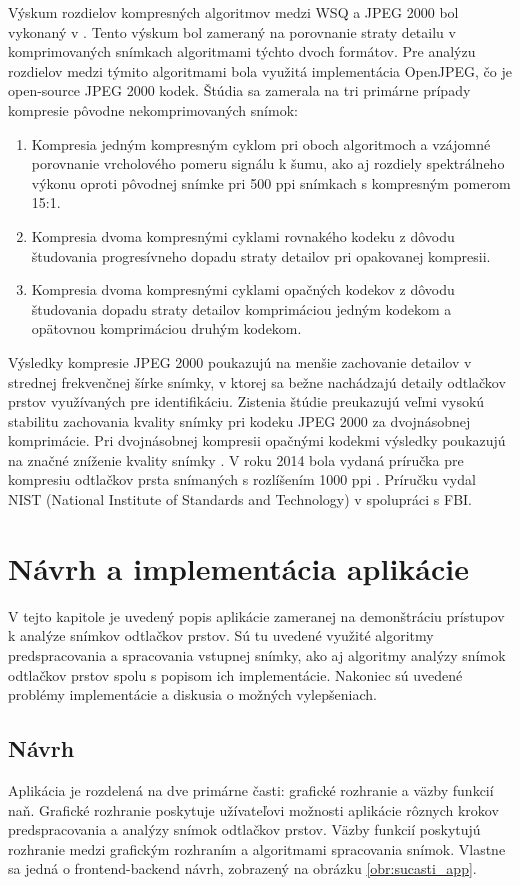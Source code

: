   Výskum rozdielov kompresných algoritmov medzi WSQ a JPEG 2000 bol vykonaný v \cite{Libert}. Tento výskum bol zameraný na porovnanie straty detailu
  v komprimovaných snímkach algoritmami týchto dvoch formátov. Pre analýzu rozdielov medzi týmito algoritmami bola využitá implementácia OpenJPEG,
  čo je open-source JPEG 2000 kodek. Štúdia sa zamerala na tri primárne prípady kompresie pôvodne nekomprimovaných snímok:
  \begin{enumerate}
    \item Kompresia jedným kompresným cyklom pri oboch algoritmoch a vzájomné porovnanie vrcholového pomeru signálu k šumu, ako aj rozdiely spektrálneho
          výkonu oproti pôvodnej snímke pri 500 ppi snímkach s kompresným pomerom 15:1.
    \item Kompresia dvoma kompresnými cyklami rovnakého kodeku z dôvodu študovania progresívneho dopadu straty detailov pri opakovanej kompresii.
    \item Kompresia dvoma kompresnými cyklami opačných kodekov z dôvodu študovania dopadu straty detailov komprimáciou jedným kodekom a opätovnou komprimáciou
          druhým kodekom.
  \end{enumerate}
  Výsledky kompresie JPEG 2000 poukazujú na menšie zachovanie detailov v strednej frekvenčnej šírke snímky, v ktorej sa bežne nachádzajú detaily odtlačkov
  prstov využívaných pre identifikáciu. Zistenia štúdie preukazujú veľmi vysokú stabilitu zachovania kvality snímky pri kodeku JPEG 2000 za dvojnásobnej
  komprimácie. Pri dvojnásobnej kompresii opačnými kodekmi výsledky poukazujú na značné zníženie kvality snímky \cite{Libert}. V roku 2014 bola vydaná
  príručka pre kompresiu odtlačkov prsta snímaných s rozlíšením 1000 ppi \cite{orandi2014guidance}. Príručku vydal NIST (National Institute of Standards
  and Technology) v spolupráci s FBI.

\chapter{Návrh a implementácia aplikácie} \label{kap:navrh_appky}
  V tejto kapitole je uvedený popis aplikácie zameranej na demonštráciu prístupov k analýze snímkov odtlačkov prstov. Sú tu uvedené využité algoritmy
  predspracovania a spracovania vstupnej snímky, ako aj algoritmy analýzy snímok odtlačkov prstov spolu s popisom ich implementácie. Nakoniec sú uvedené
  problémy implementácie a diskusia o možných vylepšeniach.

  \section{Návrh}
  Aplikácia je rozdelená na dve primárne časti: grafické rozhranie a väzby funkcií naň. Grafické rozhranie poskytuje užívateľovi možnosti aplikácie
  rôznych krokov predspracovania a analýzy snímok odtlačkov prstov. Väzby funkcií poskytujú rozhranie medzi grafickým rozhraním a algoritmami spracovania
  snímok. Vlastne sa jedná o frontend-backend návrh, zobrazený na obrázku \ref{obr:sucasti_app}.

